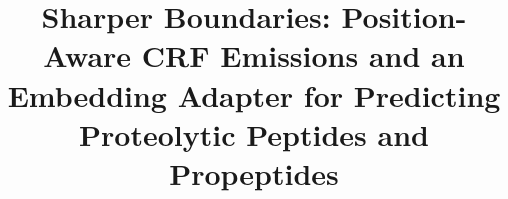 \documentclass{article}
\begin{document}
\title{Sharper Boundaries: Position-Aware CRF Emissions and an Embedding
Adapter for Predicting Proteolytic Peptides and Propeptides}

\maketitle

%
%
%
\end{document}
